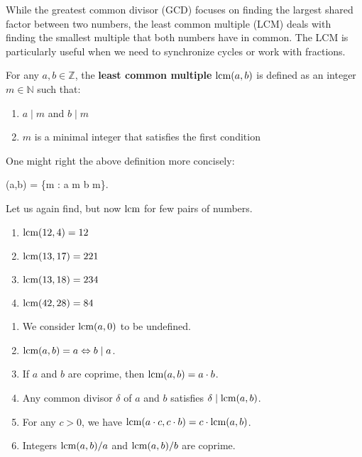 \documentclass[../lecture-notes-148x210.tex]{subfiles}
\begin{document}
While the greatest common divisor (GCD) focuses on finding the largest shared factor between two numbers, the least common multiple (LCM) deals with finding the smallest multiple that both numbers have in common. The LCM is particularly useful when we need to synchronize cycles or work with fractions.

\begin{definition}[LCM]
    For any $a, b \in \mathbb{Z}$, the \textbf{least common multiple} $\text{lcm}(a,
    b)$ is defined as an integer $m \in \mathbb{N}$ such that:
    \begin{enumerate}
        \item $a \mid m$ and $b \mid m$
        \item $m$ is a minimal integer that satisfies the first condition 
    \end{enumerate}

    One might right the above definition more concisely:
    \begin{xequation}
        \lcm(a,b) = \min\{m \in {}: a \mid m \;  \; b \mid m\}.
    \end{xequation}
\end{definition}

\begin{example}
    Let us again find, but now $\text{lcm}$ for few pairs of numbers.
    \hfill
    \begin{multicols}{2}
        \begin{enumerate}
            \item $\text{lcm}(12, 4) = 12$
            \item $\text{lcm}(13, 17) = 221$
            \item $\text{lcm}(13, 18) = 234$
            \item $\text{lcm}(42, 28) = 84$
        \end{enumerate}
    \end{multicols}
\end{example}

\begin{lemma} 
    \hfil
    \begin{enumerate}
        \item We consider $\text{lcm}(a, 0)$ to be undefined.
        \item $\text{lcm}(a, b) = a \Leftrightarrow b \mid a$.
        \item If $a$ and $b$ are coprime, then $\text{lcm}(a, b) = a \cdot b$.
        \item Any common divisor $\delta$ of $a$ and $b$ satisfies $\delta \mid \text{lcm}(a, b)$.
        \item For any $c > 0$, we have $\text{lcm}(a \cdot c, c \cdot b) =  c \cdot \text{lcm}(a, b)$.
        \item Integers $\text{lcm}(a, b)/a$ and $\text{lcm}(a, b) / b$ are coprime.
    \end{enumerate}
\end{lemma}
\end{document}
